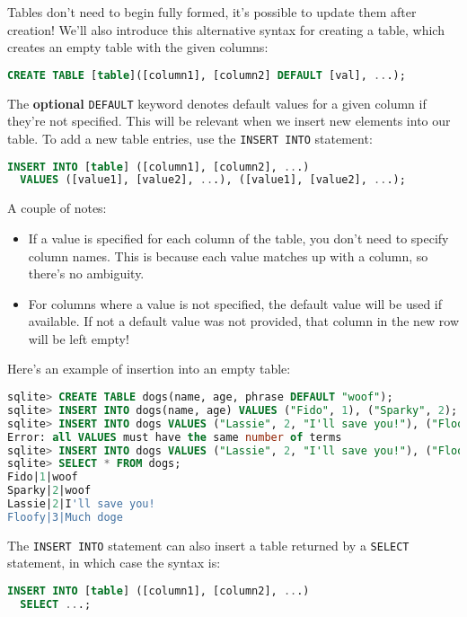 Tables don't need to begin fully formed, it's possible to update them
after creation! We'll also introduce this alternative syntax for creating
a table, which creates an empty table with the given columns:
\begin{lstlisting}[language=SQL]
CREATE TABLE [table]([column1], [column2] DEFAULT [val], ...);
\end{lstlisting}
The \textbf{optional} \texttt{DEFAULT} keyword denotes default values for
a given column if they're not specified. This will be relevant when we
insert new elements into our table.  To add a new table entries, use the
\texttt{INSERT INTO} statement:
\begin{lstlisting}[language=SQL]
INSERT INTO [table] ([column1], [column2], ...)
  VALUES ([value1], [value2], ...), ([value1], [value2], ...);
\end{lstlisting}
A couple of notes:
\begin{itemize}
    \item If a value is specified for each column of the table, you don't
        need to specify column names. This is because each value matches
        up with a column, so there's no ambiguity.
    \item For columns where a value is not specified, the default value
        will be used if available. If not a default value was not provided,
        that column in the new row will be left empty!
\end{itemize}

Here's an example of insertion into an empty table:
\begin{lstlisting}[language=SQL]
sqlite> CREATE TABLE dogs(name, age, phrase DEFAULT "woof");
sqlite> INSERT INTO dogs(name, age) VALUES ("Fido", 1), ("Sparky", 2);
sqlite> INSERT INTO dogs VALUES ("Lassie", 2, "I'll save you!"), ("Floofy", 3);
Error: all VALUES must have the same number of terms
sqlite> INSERT INTO dogs VALUES ("Lassie", 2, "I'll save you!"), ("Floofy", 3, "Much doge");
sqlite> SELECT * FROM dogs;
Fido|1|woof
Sparky|2|woof
Lassie|2|I'll save you!
Floofy|3|Much doge
\end{lstlisting}

The \texttt{INSERT INTO} statement can also insert a table returned by a \texttt{SELECT} 
statement, in which case the syntax is:

\begin{lstlisting}[language=SQL]
INSERT INTO [table] ([column1], [column2], ...)
  SELECT ...;
\end{lstlisting}

